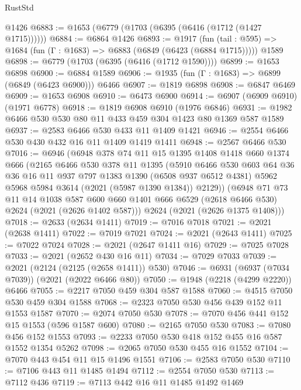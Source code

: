\begin{lexlean}{RustStd}
\begin{coremodule}
{\begin{coremodule}
{{{{{{{{{{{{{{{{    @1426
@6883 := @1653 (@6779 (@1703 (@6395 (@6416 (@1712 (@1427 @1715))))))
@6884 := @6864 @1426
@6893 := @1917
    (fun (tail : @595) => @1684 (fun (Γ : @1683) => @6883 (@6849 (@6423 (@6884 @1715)))))
    @1589
@6898 := @6779 (@1703 (@6395 (@6416 (@1712 @1590))))
@6899 := @1653 @6898
@6900 := @6884 @1589
@6906 := @1935 (fun (Γ : @1683) => @6899 (@6849 (@6423 @6900))) @6466
@6907 := @1819 @6898
@6908 := @6847 @6469
@6909 := @1653 @6908
@6910 := @6473 @6900
@6914 := @6907 (@6909 @6910) (@1971 @6778)
@6918 := @1819 @6908 @6910 (@1976 @6846)
@6931 := @1982 @6466 @530 @530 @80 @11 @433 @459 @304 @1423 @80 @1369 @587 @1589
@6937 := @2583 @6466 @530 @433 @11 @1409 @1421
@6946 := @2554 @6466 @530 @430 @432 @16 @11 @1409 @1419 @1411
@6948 := @2567 @6466 @530
@7016 := @6946
    (@6948
      @378
      @74
      @11
      @15
      @1395
      @1408
      @1418
      @660
      @1374
      @666
      (@2165
        @6466
        @530
        @378
        @11
        @1395
        (@5910
          @6466
          @530
          @603
          @64
          @36
          @36
          @16
          @11
          @937
          @797
          @1383
          @1390
          (@6508 @937 @6512 @4381)
          @5962
          @5968
          @5984
          @3614
          (@2021 (@5987 @1390 @1384))
          @2129))
      (@6948
        @71
        @73
        @11
        @14
        @1038
        @587
        @600
        @660
        @1401
        @666
        @6529
        (@2618 @6466 @530)
        @2624
        (@2021 (@2626 @1402 @587)))
      @2624
      (@2021 (@2626 @1375 @1408)))
@7018 := @2633 (@2634 @1411)
@7019 := @7016 @7018
@7021 := @2021 (@2638 @1411)
@7022 := @7019 @7021
@7024 := @2021 (@2643 @1411)
@7025 := @7022 @7024
@7028 := @2021 (@2647 @1411 @16)
@7029 := @7025 @7028
@7033 := @2021 (@2652 @430 @16 @11)
@7034 := @7029 @7033
@7039 := @2021 (@2124 (@2125 (@2658 @1411)) @530)
@7046 := @6931 (@6937 (@7034 @7039)) (@2021 (@2022 @6466 @80))
@7050 := @1948 (@2218 (@4299 @2220)) @6466
@7055 := @2217 @7050 @459 @304 @587 @1588
@7060 := @4515 @7050 @530 @459 @304 @1588
@7068 := @2323 @7050 @530 @456 @439 @152 @11 @1553 @1587
@7070 := @2074 @7050 @530
@7078 := @7070 @456 @441 @152 @15 @1553 (@596 @1587 @600)
@7080 := @2165 @7050 @530
@7083 := @7080 @456 @152 @1553
@7093 := @2233 @7050 @530 @418 @152 @455 @16 @587 @1552 @1354 @5262
@7098 := @2065 @7050 @530 @455 @16 @1552
@7104 := @7070 @443 @454 @11 @15 @1496 @1551
@7106 := @2583 @7050 @530
@7110 := @7106 @443 @11 @1485 @1494
@7112 := @2554 @7050 @530
@7113 := @7112 @436
@7119 := @7113 @442 @16 @11 @1485 @1492 @1469
}}}}}}}}}}}}}}}}
\end{coremodule}}
\end{coremodule}
\end{lexlean}
